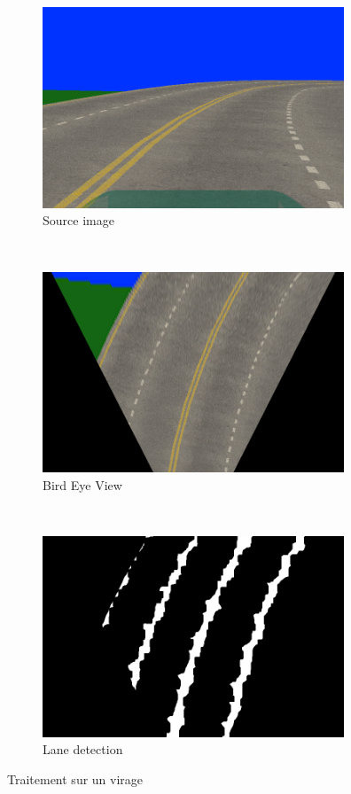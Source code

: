 \documentclass[12pt, openany]{report}
\begin{document}
\begin{figure}[!h]
     \centering
     \begin{subfigure}[b]{0.3\textwidth}
         \centering
         \includegraphics[width=\textwidth, height = 6cm]{virageD.png}
         \caption{Source image}
     \end{subfigure}
     ~
     \begin{subfigure}[b]{0.3\textwidth}
         \centering
         \includegraphics[width=\textwidth, height = 6cm]{birdVie1.png}
         \caption{Bird Eye View}
     \end{subfigure}
     ~
     \begin{subfigure}[b]{0.3\textwidth}
         \centering
         \includegraphics[width=\textwidth, height = 6cm]{postProcess1.png}
         \caption{Lane detection}
     \end{subfigure}
        \caption{Traitement sur un virage}
        \label{fig:three graphs}
\end{figure}
\end{document}
